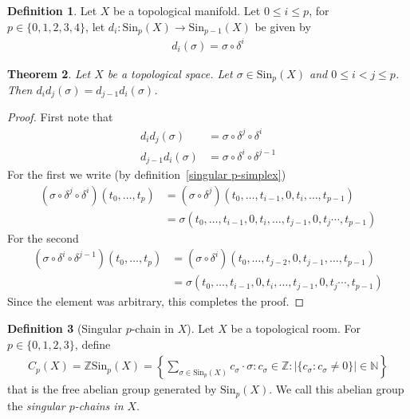\documentclass{article}
\theoremstyle{plain}
\newtheorem{theorem}{Theorem}
\theoremstyle{definition}
\newtheorem{definition}[theorem]{Definition}
\newcommand{\N}{\mathbb{N}}
\newcommand{\Z}{\mathbb{Z}}
\newcommand{\Sin}{\text{Sin}}
\begin{document}
\begin{definition}\label{di wall-map}
	Let $X$ be a topological manifold. Let $0\leq i\leq p$, for\newline
	$p\in\{0,1,2,3,4\}$, let $d_i:\Sin_p(X)\rightarrow \Sin_{p-1}(X)$ be given
	by
	\begin{equation}
	\begin{aligned}
		d_i(\sigma)=\sigma \circ\delta^i
	\end{aligned}
	\end{equation}
\end{definition}
\begin{theorem}
	Let $X$ be a topological space. Let $\sigma\in \Sin_p(X)$ and $0\leq i<j\leq
	p$. Then $d_i d_j(\sigma)=d_{j-1}d_i(\sigma)$.
\end{theorem}
\begin{proof}
	First note that
	\begin{equation}
	\begin{aligned}
		d_i d_j(\sigma) &=\sigma\circ\delta^j\circ\delta^i\\
		d_{j-1}d_i(\sigma) &=\sigma\circ\delta^i\circ\delta^{j-1}
	\end{aligned}
	\end{equation}
	For the first we write (by definition~\ref{singular p-simplex})
	\begin{equation}
	\begin{aligned}
		(\sigma\circ\delta^j\circ\delta^i)(t_0,\dots,t_p) &=
		(\sigma\circ\delta^j)(t_0,\dots,t_{i-1},0,t_{i},\dots,t_{p-1})\\
		&= \sigma(t_0,\dots,t_{i-1},0,t_i,\dots,t_{j-1},0,t_j\dotsi,t_{p-1})
	\end{aligned}
	\end{equation}
	For the second
	\begin{equation}
	\begin{aligned}
		(\sigma\circ\delta^i\circ\delta^{j-1})(t_0,\dots,t_p) &=
		(\sigma\circ\delta^i)(t_0,\dots,t_{j-2},0,t_{j-1},\dots,t_{p-1})\\
		&= \sigma(t_0,\dots,t_{i-1},0,t_i,\dots,t_{j-1},0,t_j\dotsi,t_{p-1})
	\end{aligned}
	\end{equation}
	Since the element was arbitrary, this completes the proof.
\end{proof}
\begin{definition}[Singular $p$-chain in $X$]\label{singular p-chain}
	Let $X$ be a topological room. For $p\in\{0,1,2,3\}$, define
	\begin{equation}
	\begin{aligned}
		C_p(X)=\Z\Sin_p(X)=\left\{\sum_{\sigma\in\Sin_p(X)}c_\sigma\cdot\sigma:
		c_\sigma\in\Z:|\{c_\sigma:c_\sigma\neq0\}|\in\N\right\}
	\end{aligned}
	\end{equation}
	that is the free abelian group generated by $\Sin_p(X)$. We call this
	abelian group the \textit{singular $p$-chains in $X$}.
\end{definition}
\end{document}
